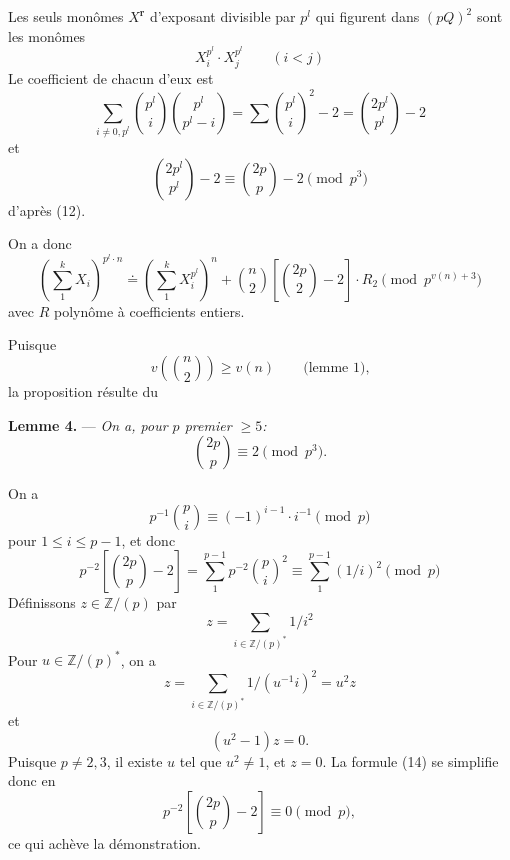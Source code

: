 \documentclass[10pt]{article}
\newcommand{\Z}{\mathbb Z}
\newcommand{\dd}{\mathrel{\doteq}}
\newcommand{\rr}{\mathbf r}
\begin{document}
Les seuls monômes $X^\rr$ d'exposant divisible par $p^l$ qui figurent dans $(pQ)^2$ sont les monômes
\[
X_i^{p^l}\cdot X_j^{p^l}\qquad(i<j)
\]
Le coefficient de chacun d'eux est
\[
\sum_{i\ne0,p^l}\binom{p^l}{i}\binom{p^l}{p^l-i}
=
\sum \binom{p^l}{i}^2-2
=
\binom{2p^l}{p^l}-2 \tag{13}
\]
et
\[
\binom{2p^l}{p^l}-2
\equiv
\binom{2p}{p}-2
\pmod {p^3}
\]
d'après (12).

On a donc
\[
\left(\sum_1^k X_i\right)^{p^l\cdot n}
\dd
\left(\sum_1^k X_i^{p^l}\right)^n
+\binom n2\left[\binom{2p}{2}-2\right]\cdot R_2
\pmod {p^{v(n)+3}}
\]
avec $R$ polynôme à coefficients entiers.

Puisque
\[
v\left(\binom n2\right)\ge v(n)\qquad\text{(lemme 1),}
\]
la proposition résulte du

\par\medskip\noindent\textbf{Lemme 4.} --- \textit{On a, pour $p$ premier $\ge5$:}
\[
\binom{2p}{p}\equiv2\pmod {p^3}.
\]

On a
\[
p^{-1}\binom pi\equiv(-1)^{i-1}\cdot i^{-1}\pmod p
\]
pour $1\le i\le p-1$, et donc
\[
p^{-2}\left[\binom{2p}{p}-2\right]
=
\sum_1^{p-1}p^{-2}\binom pi^2
\equiv
\sum_1^{p-1}(1/i)^2
\pmod p \tag{14}
\]
Définissons $z\in\Z/(p)$ par
\[
z=\sum_{i\in\Z/(p)^*}1/i^2
\]
Pour $u\in\Z/(p)^*$, on a
\[
z=\sum_{i\in\Z/(p)^*}1/(u^{-1}i)^2=u^2z
\]
et
\[
(u^2-1)z=0.
\]
Puisque $p\ne2,3$, il existe $u$ tel que $u^2\ne1$, et $z=0$. La formule (14) se simplifie donc en
\[
p^{-2}\left[\binom{2p}{p}-2\right]\equiv0\pmod p,
\]
ce qui achève la démonstration.
\end{document}
